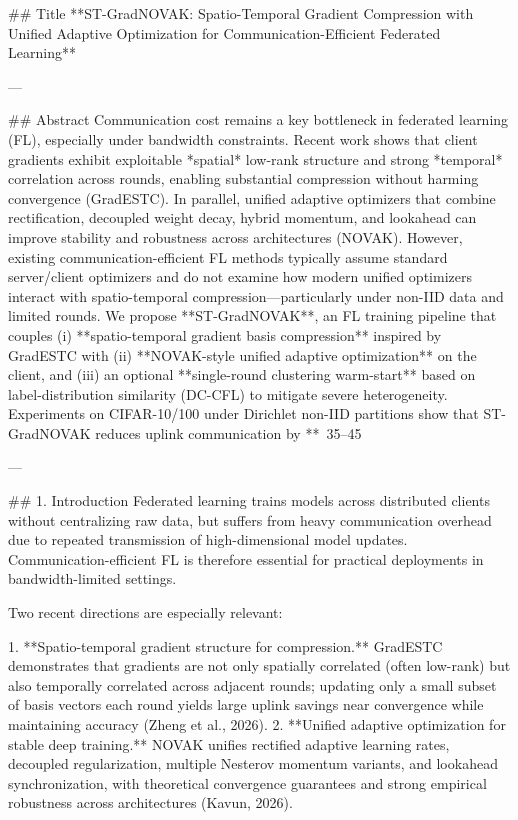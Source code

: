 ## Title  
**ST-GradNOVAK: Spatio-Temporal Gradient Compression with Unified Adaptive Optimization for Communication-Efficient Federated Learning**

---

## Abstract  
Communication cost remains a key bottleneck in federated learning (FL), especially under bandwidth constraints. Recent work shows that client gradients exhibit exploitable *spatial* low-rank structure and strong *temporal* correlation across rounds, enabling substantial compression without harming convergence (GradESTC). In parallel, unified adaptive optimizers that combine rectification, decoupled weight decay, hybrid momentum, and lookahead can improve stability and robustness across architectures (NOVAK). However, existing communication-efficient FL methods typically assume standard server/client optimizers and do not examine how modern unified optimizers interact with spatio-temporal compression—particularly under non-IID data and limited rounds.  
We propose **ST-GradNOVAK**, an FL training pipeline that couples (i) **spatio-temporal gradient basis compression** inspired by GradESTC with (ii) **NOVAK-style unified adaptive optimization** on the client, and (iii) an optional **single-round clustering warm-start** based on label-distribution similarity (DC-CFL) to mitigate severe heterogeneity. Experiments on CIFAR-10/100 under Dirichlet non-IID partitions show that ST-GradNOVAK reduces uplink communication by **~35–45%

---

## 1. Introduction  
Federated learning trains models across distributed clients without centralizing raw data, but suffers from heavy communication overhead due to repeated transmission of high-dimensional model updates. Communication-efficient FL is therefore essential for practical deployments in bandwidth-limited settings.

Two recent directions are especially relevant:

1. **Spatio-temporal gradient structure for compression.** GradESTC demonstrates that gradients are not only spatially correlated (often low-rank) but also temporally correlated across adjacent rounds; updating only a small subset of basis vectors each round yields large uplink savings near convergence while maintaining accuracy (Zheng et al., 2026).  
2. **Unified adaptive optimization for stable deep training.** NOVAK unifies rectified adaptive learning rates, decoupled regularization, multiple Nesterov momentum variants, and lookahead synchronization, with theoretical convergence guarantees and strong empirical robustness across architectures (Kavun, 2026).

